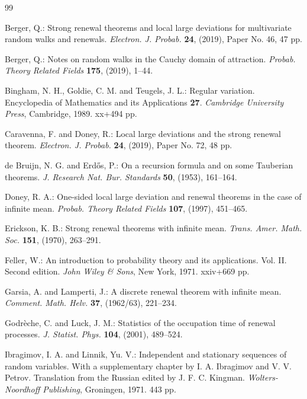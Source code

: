 \begin{thebibliography}{99}

 Berger, Q.: Strong renewal theorems and local large
  deviations for multivariate random walks and renewals. \emph{Electron. J.
  Probab.} \textbf{24}, (2019), Paper No. 46, 47 pp. 

 Berger, Q.: Notes on random walks in the Cauchy domain
  of attraction. \emph{Probab. Theory Related Fields} \textbf{175}, (2019),
  1--44. 

 Bingham, N. H., Goldie, C. M. and Teugels, J. L.: Regular
  variation. Encyclopedia of Mathematics and its Applications \textbf{27}.
  \emph{Cambridge University Press}, Cambridge, 1989. xx+494 pp.

 Caravenna, F. and Doney, R.: Local large
  deviations and the strong renewal theorem. \emph{Electron. J. Probab.}
  \textbf{24}, (2019), Paper No. 72, 48 pp. 

 de Bruijn, N. G. and Erd\H{o}s, P.: On a recursion
  formula and on some Tauberian theorems. \emph{J. Research Nat. Bur.
  Standards} \textbf{50}, (1953), 161--164. 

 Doney, R. A.: One-sided local large deviation and renewal
  theorems in the case of infinite mean. \emph{Probab. Theory Related Fields}
  \textbf{107}, (1997), 451--465.

 Erickson, K. B.: Strong renewal theorems with infinite
  mean. \emph{Trans. Amer. Math. Soc.} \textbf{151}, (1970), 263--291.

 Feller, W.: An introduction to probability theory and its
  applications. Vol. II. Second edition. \emph{John Wiley \& Sons}, New York,
  1971. xxiv+669 pp. 

 Garsia, A. and Lamperti, J.: A discrete renewal
  theorem with infinite mean. \emph{Comment. Math. Helv.} \textbf{37},
  (1962/63), 221--234.

 Godr\`eche, C. and Luck, J. M.: Statistics of the
  occupation time of renewal processes. \emph{J. Statist. Phys.}
  \textbf{104}, (2001), 489--524. 

 Ibragimov, I. A. and Linnik, Yu. V.:
  Independent and stationary sequences of random variables. With a
  supplementary chapter by I. A. Ibragimov and V. V. Petrov. Translation from
  the Russian edited by J. F. C. Kingman. \emph{Wolters-Noordhoff Publishing},
  Groningen, 1971. 443 pp. 


\end{thebibliography}

